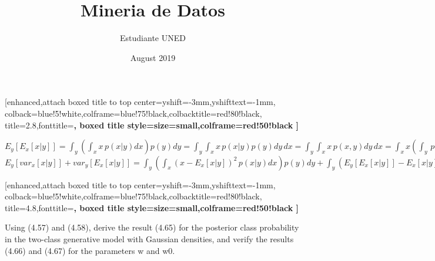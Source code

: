 \documentclass{article}
\title{Mineria de Datos}
\author{Estudiante UNED }
\date{August 2019}
\begin{document}
\maketitle

\begin {tcolorbox}
    [enhanced,attach boxed title to top center={yshift=-3mm,yshifttext=-1mm}, colback=blue!5!white,colframe=blue!75!black,colbacktitle=red!80!black, title=2.8,fonttitle=\bfseries, boxed title style={size=small,colframe=red!50!black} ]
  
\end{tcolorbox}
$ \displaystyle
    E_y\left[E_x\left[x|y\right]\right]=  
    \int_{y} \left( \int_{x}x\,p\left(x|y \right)dx \right)p\left(y \right)dy= 
    \int_{y} \int_{x}x\,p\left(x|y \right)p\left(y \right)dy\,dx =
    \int_{y} \int_{x}x\,p\left(x,y \right)dy\,dx =
    \int_{x} x \left(\int_{y}\,p\left(x,y \right)dy\right)dx =
    \int_{x} p\left(x\right)dx = E\left[x\right]
$ \\

$ \displaystyle
    E_y\left[ var_{x}\left[ x|y\right]\right] + var_{y}\left[E_x\left[x|y\right]\right]= 
    \int_{y} \left( \int_{x} \left(x-E_x\left[x|y\right]\right)^{2}\,p\left(x|y \right)dx \right)p\left(y \right)dy + \int_{y} \left(E_y\left[E_x\left[x|y\right]\right] - E_x\left[x|y\right]\right )^{2}p\left(y \right)dy= 
     \int_{y} \int_{x}\left(x^{2}-2xE_x\left[x|y\right] + E_x\left[x|y\right]^{2}\right)\,p\left(x|y \right)p\left(y \right)dy\,dx  +		\int_{y} \left(E_y\left[E_x\left[x|y\right]\right]^{2} -2E_x\left[x|y\right]E_x\left[x|y\right] +  E_x\left[x|y\right]^{2}\right)p\left(y \right)dy=
     \int_{y} \int_{x}x^{2}\,p\left(x|y \right)p\left(y \right)dy\,dx -2 \int_{y}\int_{x}xE_x\left[x|y\right]\,p\left(x|y\right)p\left(y \right)dy\,dx  + \int_{y} \int_{x}E_x\left[x|y\right]^{2}\,p\left(x|y \right)p\left(y \right)dy\,dx +
     \int_{y} E_y\left[E_x\left[x|y\right]\right]^{2} p\left(y \right)dy -2\int_{y} E_x\left[x|y\right]E_x\left[x|y\right]p\left(y \right)dy + \int_{y}  E_x\left[x|y\right]^{2}p\left(y \right)dy
$ \\

\begin {tcolorbox}
    [enhanced,attach boxed title to top center={yshift=-3mm,yshifttext=-1mm}, colback=blue!5!white,colframe=blue!75!black,colbacktitle=red!80!black, title=4.8,fonttitle=\bfseries, boxed title style={size=small,colframe=red!50!black} ]
  
Using (4.57) and (4.58), derive the result (4.65) for the posterior class probability in the two-class generative model with Gaussian densities, and verify the results (4.66) and (4.67) for the parameters w and w0.
\end{tcolorbox}
\end{document}
